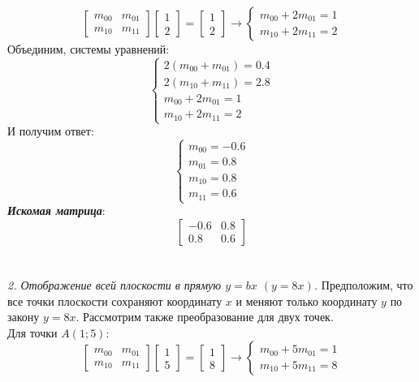 \documentclass[a5paper, 10pt]{article}
\theoremstyle{definition}
\theoremstyle{plain}
\theoremstyle{remark}
\begin{document}
\begin{equation}
\begin{bmatrix}
m_{0 0} & m_{0 1}\\
m_{1 0} & m_{1 1}
\end{bmatrix}
\begin{bmatrix}
1\\
2
\end{bmatrix}
=
\begin{bmatrix}
1\\
2
\end{bmatrix}
\to
\begin{cases}
m_{0 0} +  2m_{0 1} = 1\\
m_{1 0} + 2m_{1 1} = 2
\end{cases}
\end{equation}
Объединим, системы уравнений:
\begin{equation}
\begin{cases}
2(m_{0 0} +  m_{0 1}) = 0.4\\
2(m_{1 0} + m_{1 1}) = 2.8\\
m_{0 0} +  2m_{0 1} = 1\\
m_{1 0} + 2m_{1 1} = 2
\end{cases}
\end{equation}
И получим ответ:
\begin{equation}
\begin{cases}
m_{0 0} = -0.6\\
m_{0 1} = 0.8\\
m_{1 0} = 0.8\\
m_{1 1} = 0.6
\end{cases}
\end{equation}
\textit{\textbf{Искомая матрица}}:
\begin{equation}
\begin{bmatrix}
-0.6 & 0.8\\
0.8 & 0.6
\end{bmatrix}
\end{equation}
\\\\
\textit{2. Отображение всей плоскости в прямую $y=bx$  $(y=8x)$.}
Предположим, что все точки плоскости сохраняют координату $x$ и меняют только координату $y$ по закону $y=8x$. Рассмотрим также преобразование для двух точек.\\
Для точки $A (1; 5)$:
\begin{equation}
\begin{bmatrix}
m_{0 0} & m_{0 1}\\
m_{1 0} & m_{1 1}
\end{bmatrix}
\begin{bmatrix}
1\\
5
\end{bmatrix}
=
\begin{bmatrix}
1\\
8
\end{bmatrix}
\to
\begin{cases}
m_{0 0} +  5m_{0 1} = 1\\
m_{1 0} + 5 m_{1 1} = 8
\end{cases}
\end{equation}
\end{document}
